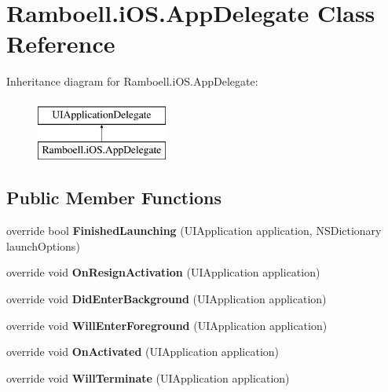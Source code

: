 \hypertarget{class_ramboell_1_1i_o_s_1_1_app_delegate}{}\section{Ramboell.\+i\+O\+S.\+App\+Delegate Class Reference}
\label{class_ramboell_1_1i_o_s_1_1_app_delegate}
Inheritance diagram for Ramboell.\+i\+O\+S.\+App\+Delegate\+:\begin{figure}[H]
\begin{center}
\leavevmode
\includegraphics[height=2.000000cm]{class_ramboell_1_1i_o_s_1_1_app_delegate}
\end{center}
\end{figure}
\subsection*{Public Member Functions}
\begin{DoxyCompactItemize}
\item 
\mbox{\label{class_ramboell_1_1i_o_s_1_1_app_delegate_a47a70f0733d5eb5bb2221ae6f000a2ef}} 
override bool {\bfseries Finished\+Launching} (U\+I\+Application application, N\+S\+Dictionary launch\+Options)
\item 
\mbox{\label{class_ramboell_1_1i_o_s_1_1_app_delegate_accf724fd5c757cab82110a38ed14023a}} 
override void {\bfseries On\+Resign\+Activation} (U\+I\+Application application)
\item 
\mbox{\label{class_ramboell_1_1i_o_s_1_1_app_delegate_a785580e8797a13254ee320be81305b60}} 
override void {\bfseries Did\+Enter\+Background} (U\+I\+Application application)
\item 
\mbox{\label{class_ramboell_1_1i_o_s_1_1_app_delegate_a356d5415429f2b43e09ee45937d23b67}} 
override void {\bfseries Will\+Enter\+Foreground} (U\+I\+Application application)
\item 
\mbox{\label{class_ramboell_1_1i_o_s_1_1_app_delegate_a40fdf69d0f15353497dd382e31e61040}} 
override void {\bfseries On\+Activated} (U\+I\+Application application)
\item 
\mbox{\label{class_ramboell_1_1i_o_s_1_1_app_delegate_adbc107395d9a56ffaeac657b6ff8126b}} 
override void {\bfseries Will\+Terminate} (U\+I\+Application application)
\end{DoxyCompactItemize}
